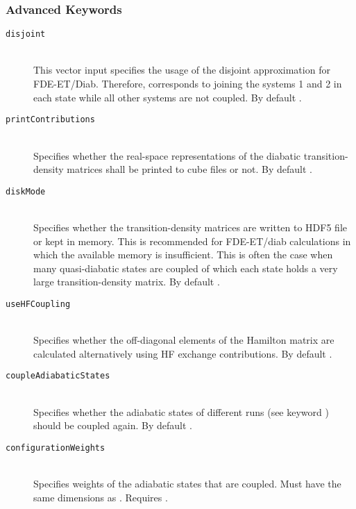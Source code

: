 \subsubsection{Advanced Keywords}
\begin{description}
  \item [\texttt{disjoint}]\hfill \\
  This vector input specifies the usage of the disjoint approximation for FDE-ET/Diab. Therefore,  corresponds to joining
  the systems 1 and 2 in each state while all other systems are not coupled. By default \ttt{\{\}}.
  \item [\texttt{printContributions}]\hfill \\
  Specifies whether the real-space representations of the diabatic transition-density matrices shall be printed to cube
  files or not. By default .
  \item [\texttt{diskMode}]\hfill \\
  Specifies whether the transition-density matrices are written to HDF5 file or kept in memory. This is recommended for FDE-ET/diab calculations in which the available memory is insufficient.
  This is often the case when many quasi-diabatic states are coupled of which each state holds a very large transition-density matrix. By default .
  \item [\texttt{useHFCoupling}]\hfill \\
  Specifies whether the off-diagonal elements of the Hamilton matrix are calculated alternatively using HF exchange contributions. By default .
  \item [\texttt{coupleAdiabaticStates}]\hfill \\
  Specifies whether the adiabatic states of different runs (see keyword ) should be coupled again. By default .
  \item [\texttt{configurationWeights}]\hfill \\
  Specifies weights of the adiabatic states that are coupled. Must have the same dimensions as . Requires .

\end{description}
